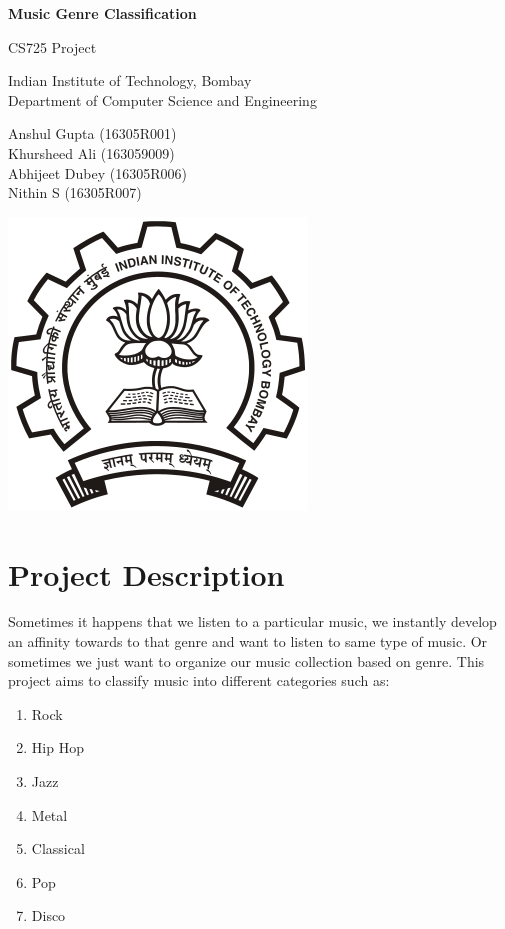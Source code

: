 \documentclass[a4paper,10pt]{article}
\begin{document}
\begin{titlepage}
\begin{center}
\vspace*{1cm}

\huge{\textbf{Music Genre Classification}}

\vspace{0.5cm}
CS725 Project

\vspace{3.5cm}
Indian Institute of Technology, Bombay\\
Department of Computer Science and Engineering
\vspace{3.5cm}

\Large{Anshul Gupta (16305R001) \\ Khursheed Ali (163059009) \\ Abhijeet Dubey (16305R006) \\ Nithin S (16305R007)}

\vfill

\vspace{0.8cm}

\includegraphics[scale=0.35]{IITB.png}
\end{center}
\end{titlepage}
 
\section{Project Description}
Sometimes it happens that we listen to a particular music, we instantly develop an affinity towards to that genre and want to listen to same type of music. Or sometimes we just want to organize our music collection based on genre.
This project aims to classify music into different categories such as:
\begin{enumerate}
 \item Rock
 \item Hip Hop
 \item Jazz
 \item Metal
 \item Classical
 \item Pop
 \item Disco
\end{enumerate}
\end{document}
